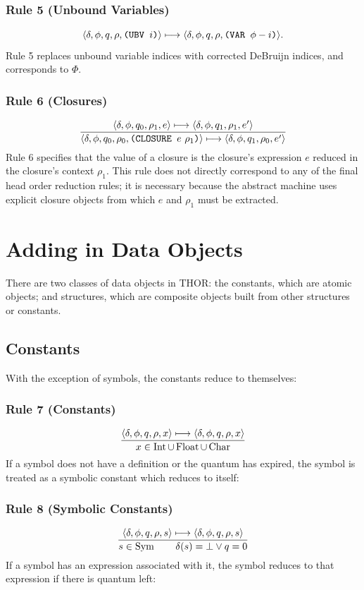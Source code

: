 \subsubsection*{Rule 5 (Unbound Variables)}
\[
\langle \delta,\phi,q,\rho,\texttt{(UBV }i\texttt{)}\rangle\longmapsto
\langle \delta,\phi,q,\rho,\texttt{(VAR }\phi-i\texttt{)}\rangle.
\]
Rule 5 replaces unbound variable indices with corrected DeBruijn indices, and
corresponds to \(\Phi\).

\subsubsection*{Rule 6 (Closures)}
\[
\frac{
\cfg{\delta}{\phi}{q_0}{\rho_1}{e}\redsto
\cfg{\delta}{\phi}{q_1}{\rho_1}{e'}
}{
\cfg{\delta}{\phi}{q_0}{\rho_0}{\THOR{(CLOSURE }e\ \rho_1\THOR{)}}\redsto
\cfg{\delta}{\phi}{q_1}{\rho_0}{e'}
}
\]
Rule 6 specifies that the value of a closure is the closure's expression \(e\)
reduced in the closure's context \(\rho_1\). This rule does not directly
correspond to any of the final head order reduction rules; it is necessary
because the abstract machine uses explicit closure objects from which \(e\) and
\(\rho_1\) must be extracted.

\section{Adding in Data Objects}

There are two classes of data objects in THOR: the constants, which are atomic
objects; and structures, which are composite objects built from other structures
or constants.

\subsection{Constants}

With the exception of symbols, the constants reduce to themselves:

\subsubsection*{Rule 7 (Constants)}
\[
\frac{\langle \delta,\phi,q,\rho,x\rangle\longmapsto
      \langle \delta,\phi,q,\rho,x\rangle}
     {x\in \operatorname{Int}\cup\operatorname{Float}\cup\operatorname{Char}}
\]
If a symbol does not have a definition or the quantum has expired, the symbol is
treated as a symbolic constant which reduces to itself:

\subsubsection*{Rule 8 (Symbolic Constants)}
\[
\frac{\langle \delta,\phi,q,\rho,s\rangle\longmapsto
      \langle \delta,\phi,q,\rho,s\rangle}
     {s\in\operatorname{Sym}\qquad \delta(s)=\bot\vee q=0}
\]
If a symbol has an expression associated with it, the symbol reduces to that
expression if there is quantum left:

